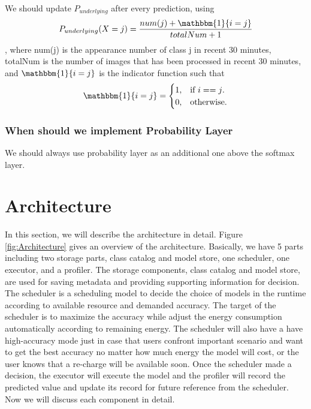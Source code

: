 \documentclass{article}
\begin{document}
We should update $P_{underlying}$ after every prediction, using 
\begin{equation}
    P_{underlying}(X = j) = \frac{num(j)+  \mathbbm{1}\{i = j\} }{totalNum + 1}
\end{equation}
, where num(j) is the appearance number of class j in recent 30 minutes, totalNum is the number of images that has been processed in recent 30 minutes, and $\mathbbm{1}\{i = j\}$ is the indicator function such that
\begin{equation}
  \mathbbm{1}\{i = j\}=\begin{cases}
    1, & \text{if $i==j$}.\\
    0, & \text{otherwise}.
  \end{cases}
\end{equation}

\subsubsection{When should we implement Probability Layer}
We should always use probability layer as an additional one above the softmax layer. 


\section{Architecture}
In this section, we will describe the architecture in detail. Figure \ref{fig:Architecture} gives an overview of the architecture. Basically, we have 5 parts including two storage parts, class catalog and model store, one scheduler, one executor, and a profiler. The storage components, class catalog and model store, are used for saving metadata and providing supporting information for decision. The scheduler is a scheduling model to decide the choice of models in the runtime according to available resource and demanded accuracy. The target of the scheduler is to maximize the accuracy while adjust the energy consumption automatically according to remaining energy. The scheduler will also have a have high-accuracy mode just in case that users confront important scenario and want to get the best accuracy no matter how much energy the model will cost, or the user knows that a re-charge will be available soon. Once the scheduler made a decision, the executor will execute the model and the profiler will record the predicted value and update its record for future reference from the scheduler. Now we will discuss each component in detail.
\end{document}
